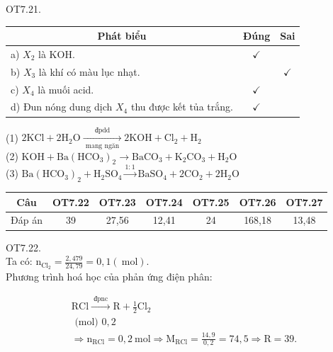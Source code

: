 \documentclass[10pt]{article}
\begin{document}
OT7.21.

\begin{center}
\begin{tabular}{|l|c|c|}
\hline
\multicolumn{1}{|c|}{Phát biểu} & Đúng & Sai \\
\hline
a) $X_{2}$ là KOH. & $\checkmark$ &  \\
\hline
b) $X_{3}$ là khí có màu lục nhạt. &  & $\checkmark$ \\
\hline
c) $X_{4}$ là muối acid. & $\checkmark$ &  \\
\hline
d) Đun nóng dung dịch $X_{4}$ thu được kết tủa trắng. & $\checkmark$ &  \\
\hline
\end{tabular}
\end{center}

(1) $2 \mathrm{KCl}+2 \mathrm{H}_{2} \mathrm{O} \xrightarrow[\text { mang ngăn }]{\text { đpdd }} 2 \mathrm{KOH}+\mathrm{Cl}_{2}+\mathrm{H}_{2}$\\
(2) $\mathrm{KOH}+\mathrm{Ba}\left(\mathrm{HCO}_{3}\right)_{2} \rightarrow \mathrm{BaCO}_{3}+\mathrm{K}_{2} \mathrm{CO}_{3}+\mathrm{H}_{2} \mathrm{O}$\\
(3) $\mathrm{Ba}\left(\mathrm{HCO}_{3}\right)_{2}+\mathrm{H}_{2} \mathrm{SO}_{4} \xrightarrow{1: 1} \mathrm{BaSO}_{4}+2 \mathrm{CO}_{2}+2 \mathrm{H}_{2} \mathrm{O}$

\begin{center}
\begin{tabular}{|c|c|c|c|c|c|c|}
\hline
Câu & OT7.22 & OT7.23 & OT7.24 & OT7.25 & OT7.26 & OT7.27 \\
\hline
Đáp án & 39 & 27,56 & 12,41 & 24 & 168,18 & 13,48 \\
\hline
\end{tabular}
\end{center}

OT7.22.\\
Ta có: $\mathrm{n}_{\mathrm{Cl}_{2}}=\frac{2,479}{24,79}=0,1(\mathrm{~mol})$.\\
Phương trình hoá học của phản ứng điện phân:

$$
\begin{gathered}
\mathrm{RCl} \xrightarrow{\text { đpnc }} \mathrm{R}+\frac{1}{2} \mathrm{Cl}_{2} \\
\text { (mol) } 0,2 \\
\Rightarrow \mathrm{n}_{\mathrm{RCl}}=0,2 \mathrm{~mol} \Rightarrow \mathrm{M}_{\mathrm{RCl}}=\frac{14,9}{0,2}=74,5 \Rightarrow \mathrm{R}=39 .
\end{gathered}
$$
\end{document}
